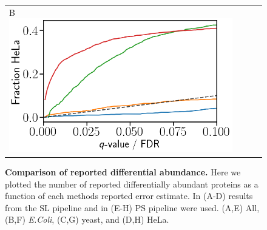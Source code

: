\documentclass[11pt]{article}
\begin{document}
\begin{figure}[hbt]
\begin{tabular}{lclc}
        B \includegraphics[width=0.5\linewidth]{../../result/report_plots/diann_FP_DE_all.png} & \\%
    \end{tabular}
    \caption{{\bf Comparison of reported differential abundance.} Here we plotted the number of reported differentially abundant proteins as a function of each methods reported error estimate. In (A-D) results from the SL pipeline and in (E-H) PS pipeline were used. 
    (A,E) All, (B,F) \textit{E.Coli}, (C,G) yeast, and (D,H) HeLa. \label{fig:da_methods_esimate}}
\end{figure}
\fi


\iffalse
\end{document}

